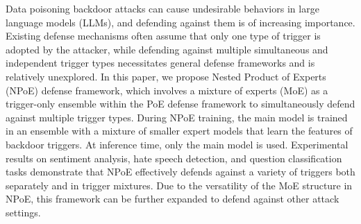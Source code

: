 Data poisoning backdoor attacks can cause undesirable behaviors in large language models (LLMs), and defending against them is of increasing importance. Existing defense mechanisms often assume that only one type of trigger is adopted by the attacker, while defending against multiple simultaneous and independent trigger types necessitates general defense frameworks and is relatively unexplored. In this paper, we propose Nested Product of Experts (NPoE) defense framework, which involves a mixture of experts (MoE) as a trigger-only ensemble within the PoE defense framework to simultaneously defend against multiple trigger types. During NPoE training, the main model is trained in an ensemble with a mixture of smaller expert models that learn the features of backdoor triggers. At inference time, only the main model is used. Experimental results on sentiment analysis, hate speech detection, and question classification tasks demonstrate that NPoE effectively defends against a variety of triggers both separately and in trigger mixtures. Due to the versatility of the MoE structure in NPoE, this framework can be further expanded to defend against other attack settings.